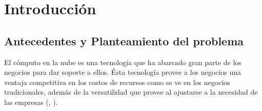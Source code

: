 

\chead{}
\rhead{\thepage}



\chapter*{Introducci\'on}


\section*{Antecedentes y Planteamiento del problema}


El c\'omputo en la nube es una tecnolog\'ia que ha abarcado gran parte de los negocios  para dar soporte a ellos. \'Esta tecnolog\'ia provee a los negocios una ventaja competitiva en los costos de recursos como se ve en los negocios tradicionales, adem\'as de la versatilidad que provee al ajustarse a la necesidad de las empresas (\citeauthor{srinivasan2014cloud}, \citeyear{srinivasan2014cloud}).




